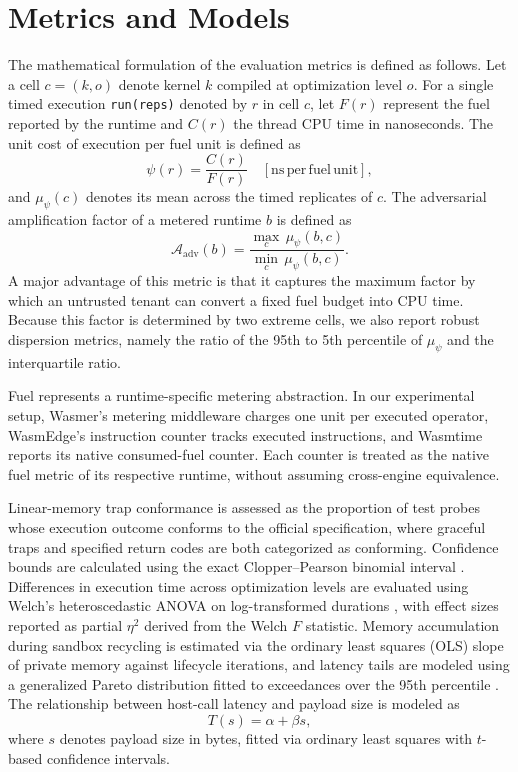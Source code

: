 \documentclass{ws-jcsc}
\begin{document}
\section{Metrics and Models}
\label{sec:metrics}
\label{sec:models}
The mathematical formulation of the evaluation metrics is defined as follows. Let a cell $c=(k,o)$ denote kernel $k$ compiled at optimization level $o$. For a single timed execution \texttt{run(reps)} denoted by $r$ in cell $c$, let $F(r)$ represent the fuel reported by the runtime and $C(r)$ the thread CPU time in nanoseconds. The unit cost of execution per fuel unit is defined as
\begin{equation}
\psi(r) = \frac{C(r)}{F(r)} \quad [\mathrm{ns\,per\,fuel\,unit}],
\end{equation}
and $\mu_\psi(c)$ denotes its mean across the timed replicates of $c$. The adversarial amplification factor of a metered runtime $b$ is defined as
\begin{equation}
\mathcal{A}_{\mathrm{adv}}(b) = \frac{\max_{c}\,\mu_{\psi}(b,c)}{\min_{c}\,\mu_{\psi}(b,c)}.
\end{equation}
A major advantage of this metric is that it captures the maximum factor by which an untrusted tenant can convert a fixed fuel budget into CPU time. Because this factor is determined by two extreme cells, we also report robust dispersion metrics, namely the ratio of the 95th to 5th percentile of $\mu_\psi$ and the interquartile ratio.

Fuel represents a runtime-specific metering abstraction. In our experimental setup, Wasmer's metering middleware charges one unit per executed operator, WasmEdge's instruction counter tracks executed instructions, and Wasmtime reports its native consumed-fuel counter. Each counter is treated as the native fuel metric of its respective runtime, without assuming cross-engine equivalence.

Linear-memory trap conformance is assessed as the proportion of test probes whose execution outcome conforms to the official specification, where graceful traps and specified return codes are both categorized as conforming. Confidence bounds are calculated using the exact Clopper--Pearson binomial interval \cite{clopper1934use}. Differences in execution time across optimization levels are evaluated using Welch's heteroscedastic ANOVA on log-transformed durations \cite{welch1951comparison}, with effect sizes reported as partial $\eta^2$ derived from the Welch $F$ statistic. Memory accumulation during sandbox recycling is estimated via the ordinary least squares (OLS) slope of private memory against lifecycle iterations, and latency tails are modeled using a generalized Pareto distribution fitted to exceedances over the 95th percentile \cite{davison1990exceedances}. The relationship between host-call latency and payload size is modeled as
\begin{equation}
T(s) = \alpha + \beta s,
\end{equation}
where $s$ denotes payload size in bytes, fitted via ordinary least squares with $t$-based confidence intervals.
\end{document}
